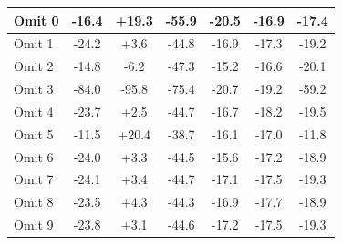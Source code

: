 \begin{table}[!h]
\begin{center}
\begin{tabular}[h]{|l||c|c|c|c|c||c|}
Omit 0& -16.4& +19.3& -55.9& -20.5& -16.9& -17.4\\\hline
Omit 1& -24.2& +3.6& -44.8& -16.9& -17.3& -19.2\\\hline
Omit 2& -14.8& -6.2& -47.3& -15.2& -16.6& -20.1\\\hline
{\color{Gray}Omit 3}&{\color{Gray} -84.0}&{\color{Gray} -95.8}&{\color{Gray} -75.4}&{\color{Gray} -20.7}&{\color{Gray} -19.2}&{\color{Gray} -59.2}\\\hline
Omit 4& -23.7& +2.5& -44.7& -16.7& -18.2& -19.5\\\hline
Omit 5& -11.5& +20.4& -38.7& -16.1& -17.0& -11.8\\\hline
Omit 6& -24.0& +3.3& -44.5& -15.6& -17.2& -18.9\\\hline
Omit 7& -24.1& +3.4& -44.7& -17.1& -17.5& -19.3\\\hline
Omit 8& -23.5& +4.3& -44.3& -16.9& -17.7& -18.9\\\hline
Omit 9& -23.8& +3.1& -44.6& -17.2& -17.5& -19.3\\\hline
\end{tabular}
\end{center}
\label{tab:run1_dithering_corrections_table}
\end{table}


